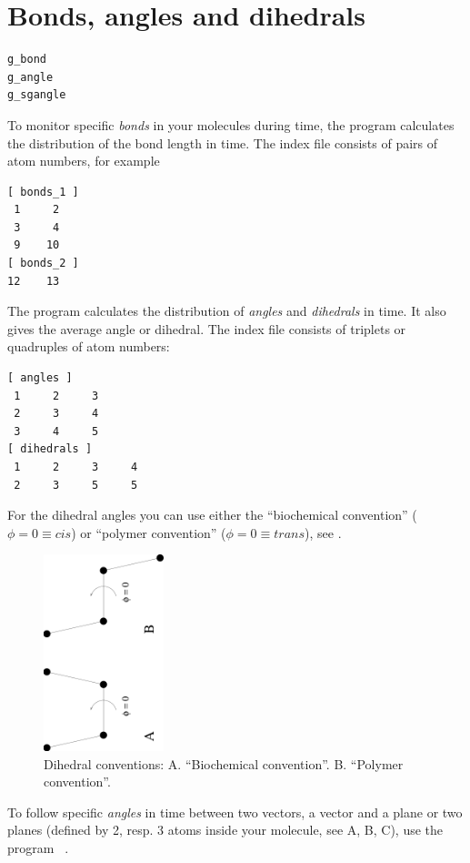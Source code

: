 % 
% 
\section{Bonds, angles and dihedrals}
\label{sec:bad}
\begin{verbatim}
g_bond
g_angle
g_sgangle
\end{verbatim}
To monitor specific {\em bonds} in your molecules during time, the program 
{\tt {}} calculates the distribution of the bond length in time. 
The index file consists of pairs of atom numbers, for example
{\samepage
\begin{verbatim}
[ bonds_1 ]
 1     2
 3     4
 9    10
[ bonds_2 ]
12    13
\end{verbatim}}

The program {\tt {}} calculates the distribution of {\em angles} and 
{\em dihedrals} in time. It also gives the average angle or dihedral. 
The index file consists of triplets or quadruples of atom numbers:
{\samepage
\begin{verbatim}
[ angles ]
 1     2     3
 2     3     4
 3     4     5
[ dihedrals ]
 1     2     3     4
 2     3     5     5
\end{verbatim}}

For the dihedral angles you can use either the ``biochemical convention'' 
($\phi = 0 \equiv cis$) or ``polymer convention'' ($\phi = 0 \equiv trans$), 
see .

\begin{figure}
\centerline{
{\includegraphics[width=3.5cm,angle=270]{plots/dih_def}}}
\caption[Dihedral conventions.]{Dihedral conventions: A. ``Biochemical
convention''. B. ``Polymer convention''.}
\label{fig:dih_def}
\end{figure}

To follow specific {\em angles} in time between two vectors, a vector
and a plane or two planes (defined by 2, resp. 3 atoms inside your
molecule, see A, B, C), use the program {\tt
{}}.

